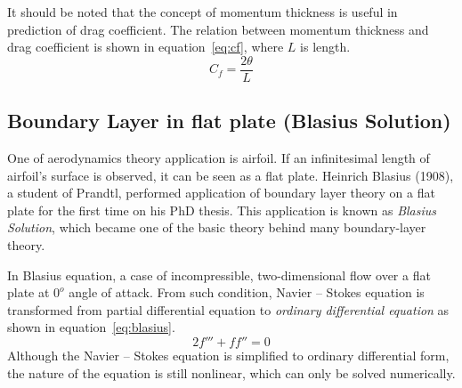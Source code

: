 It should be noted that the concept of momentum thickness is useful in prediction of drag coefficient. The relation between momentum thickness and drag coefficient is shown in equation~\ref{eq:cf}, where $L$ is length.
\begin{equation}\label{eq:cf}
C_f = \frac{2\theta}{L}
\end{equation}

\subsection{Boundary Layer in flat plate (Blasius Solution)} 
One of aerodynamics theory application is airfoil. If an infinitesimal length of airfoil's surface is observed, it can be seen as a flat plate. Heinrich Blasius (1908), a student of Prandtl,  performed application of boundary layer theory on a flat plate for the first time on his PhD thesis. This application is known as \emph{Blasius Solution}, which became one of the basic theory behind many boundary-layer theory.

In Blasius equation, a case of incompressible, two-dimensional flow over a flat plate at $0^o$ angle of attack. From such condition, Navier -- Stokes equation is transformed from partial differential equation to \emph{ordinary differential equation} as shown in equation~\ref{eq:blasius}.
\begin{equation}\label{eq:blasius}
2f''' + f f''=0
\end{equation}
Although the Navier -- Stokes equation is simplified to ordinary differential form, the nature of the equation is still nonlinear, which can only be solved numerically.

